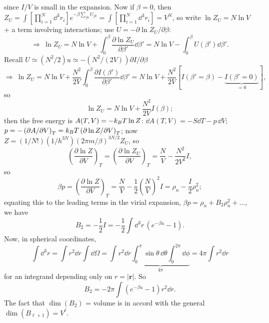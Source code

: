 since $I/V$ is small in the expansion. Now if $\beta = 0$, then
$Z_U = \int[\prod_{i=1}^N\dd^3r_i]e^{-\beta\sum_{jk}U_{jk}} = \int[\prod_{i=1}^N\dd^3r_i] = V^N$, so write
$\ln Z_U = N\ln V$ + a term involving interactions; use $U = -\partial\ln Z_U/\partial\beta$:
\begin{equation}
  \Rightarrow\ \ln Z_U = N\ln V + \int_0^\beta\frac{\partial\ln Z_U}{\partial\beta'}\dd\beta' = N\ln V - \int_0^\beta U(\beta')\dd\beta'.
\end{equation}
Recall $U\simeq(N^2/2)u\simeq-(N^2/(2V))\partial I/\partial \beta$
\begin{equation}
  \Rightarrow\ \ln Z_U = N\ln V + \frac{N^2}{2V}\int_0^\beta\frac{\partial I(\beta')}{\partial\beta'}\dd\beta'
  = N\ln V + \frac{N^2}{2V}\left[I(\beta'=\beta) - \underbrace{I(\beta'=0)}_{=0}\right],
\end{equation}
so
\begin{equation}
  \ln Z_U = N\ln V + \frac{N^2}{2V}I(\beta);
\end{equation}
then the free energy is $A(T,V) = -k_{B} T\ln Z$: $\dd A(T,V) = -S\dd T - p\,\dd V$;
$p = -\left(\partial A/\partial V\right)_T = k_{B} T\left(\partial\ln Z/\partial V\right)_T$; now
$Z = (1/N!)(1/h^{3N})\left(2\pi m/\beta\right)^{3N/2}Z_U$, so
\begin{equation}
  \left(\frac{\partial\ln Z}{\partial V}\right)_T = \left(\frac{\partial\ln Z_U}{\partial V}\right)_T = \frac{N}{V} - \frac{N^2}{2V^2}I,
\end{equation}
so
\begin{equation}
  \beta p = \left(\frac{\partial\ln Z}{\partial V}\right)_T = \frac{N}{V} - \frac{1}{2}\left(\frac{N}{V}\right)^2I = \rho_n - \frac{I}{2}\rho_n^2;
\end{equation}
equating this to the leading terms in the virial expansion, $\beta p = \rho_n + B_2\rho_n^2 + \ldots$, we have
\begin{equation}
  \boxed{B_2 = -\frac{1}{2}I = -\frac{1}{2}\int\dd^3r\,(e^{-\beta u}-1)}.
\end{equation}
Now, in spherical coordinates,
\begin{equation}
  \int\dd^3r = \int r^2\dd r\int\dd\Omega = \int r^2\dd r\underbrace{\int_0^\pi\sin\theta\,\dd\theta\int_0^{2\pi}\dd\phi}_{4\pi}
  = 4\pi\int r^2\dd r
\end{equation}
for an integrand depending only on $r = |\mathbf r|$. So
\begin{equation}
  \boxed{B_2 = -2\pi\int(e^{-\beta u}-1)r^2\dd r}.
\end{equation}
The fact that $\dim(B_2)$ = volume is in accord with the general $\dim(B_{\ell+1}) = V^\ell$.


